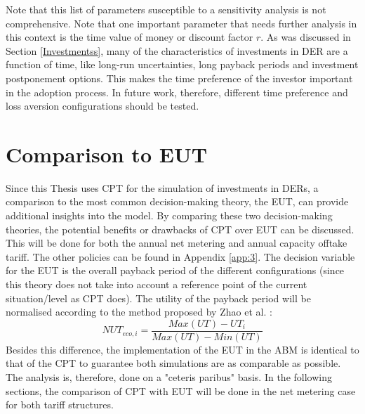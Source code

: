 \newline \newline \noindent
Note that this list of parameters susceptible to a sensitivity analysis is not comprehensive. Note that one important parameter that needs further analysis in this context is the time value of money or discount factor $r$. As was discussed in Section \ref{Investmentss}, many of the characteristics of investments in DER are a function of time, like long-run uncertainties, long payback periods and investment postponement options. This makes the time preference of the investor important in the adoption process. In future work, therefore, different time preference and loss aversion configurations should be tested. 
\section{Comparison to EUT} \label{EUTcompar}
Since this Thesis uses CPT for the simulation of investments in DERs, a comparison to the most common decision-making theory, the EUT, can provide additional insights into the model. By comparing these two decision-making theories, the potential benefits or drawbacks of CPT over EUT can be discussed. This will be done for both the annual net metering and annual capacity offtake tariff. The other policies can be found in Appendix \ref{app:3}. 
\newline \newline \noindent
The decision variable for the EUT is the overall payback period of the different configurations (since this theory does not take into account a reference point of the current situation/level as CPT does). The utility of the payback period will be normalised according to the method proposed by Zhao et al. \cite{ABMPV}:
\begin{equation} \label{EUTnorms}
	NUT_{eco,i} = \frac{Max(UT) - UT_{i}}{Max(UT) - Min(UT)}
\end{equation}
Besides this difference, the implementation of the EUT in the ABM is identical to that of the CPT to guarantee both simulations are as comparable as possible. The analysis is, therefore, done on a "ceteris paribus" basis. In the following sections, the comparison of CPT with EUT will be done in the net metering case for both tariff structures.
